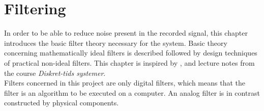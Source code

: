 \chapter{Filtering} \label{ch8}
In order to be able to reduce noise present in the recorded signal, this chapter introduces the basic filter theory necessary for the system. Basic theory concerning mathematically ideal filters is described followed by design techniques of practical non-ideal filters. This chapter is inspired by \cite{chapters 5, 7, DTSP}, \cite{section 3.4.4, FSP} and lecture notes from the course \textit{Diskret-tids systemer}. \\
Filters concerned in this project are only digital filters, which means that the filter is an algorithm to be executed on a computer. An analog filter is in contrast constructed by physical components.




